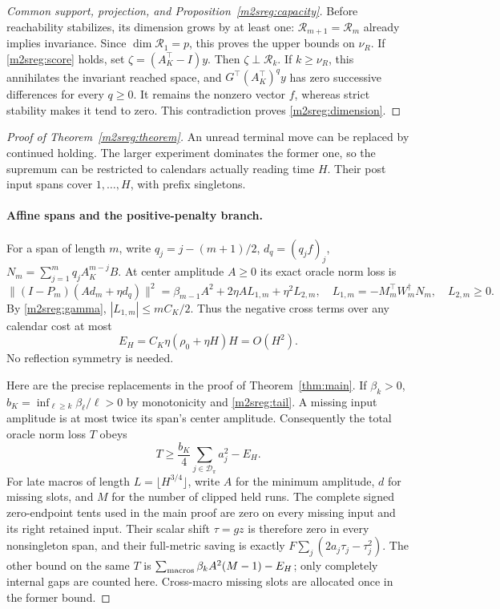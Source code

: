 \documentclass[11pt]{article}
\begin{document}
\begin{proof}[Common support, projection, and Proposition~\ref{m2sreg:capacity}]
Before reachability stabilizes, its dimension grows by at least one:
$\mathcal R_{m+1}=\mathcal R_m$ already implies invariance.
Since $\dim\mathcal R_1=p$, this proves the upper bounds on $\nu_R$.
If \eqref{m2sreg:score} holds, set $\zeta=(A_K^\top-I)y$.
Then $\zeta\perp\mathcal R_k$.
If $k\ge\nu_R$, this annihilates the invariant reached space, and
$G^\top(A_K^\top)^q y$ has zero successive differences for every
$q\ge0$. It remains the nonzero vector $f$, whereas strict stability
makes it tend to zero. This contradiction proves
\eqref{m2sreg:dimension}.
\end{proof}

\begin{proof}[Proof of Theorem~\ref{m2sreg:theorem}]
An unread terminal move can be replaced by continued holding.
The larger experiment dominates the former one, so the supremum can
be restricted to calendars actually reading time $H$.
Their post input spans cover $1,\ldots,H$, with prefix singletons.

\paragraph{Affine spans and the positive-penalty branch.}
For a span of length $m$, write $q_j=j-(m+1)/2$,
$d_q=(q_jf)_j$, $N_m=\sum_{j=1}^m q_jA_K^{m-j}B$.
At center amplitude $A\ge0$ its exact oracle norm loss is
\begin{equation}\label{m2sreg:affine}
\|(I-P_m)(A d_m+\eta d_q)\|^2
=\beta_{m-1}A^2+2\eta A L_{1,m}+\eta^2L_{2,m},
\quad
L_{1,m}=-M_m^\top W_m^\dagger N_m,\quad L_{2,m}\ge0 .
\end{equation}
By \eqref{m2sreg:gamma}, $|L_{1,m}|\le mC_K/2$.
Thus the negative cross terms over any calendar cost at most
\begin{equation}\label{m2sreg:crossbudget}
E_H=C_K\eta(\rho_0+\eta H)H=O(H^2).
\end{equation}
No reflection symmetry is needed.

Here are the precise replacements in the proof of
Theorem~\ref{thm:main}. If $\beta_k>0$,
$b_K=\inf_{\ell\ge k}\beta_\ell/\ell>0$ by monotonicity and
\eqref{m2sreg:tail}. A missing input amplitude is at most twice
its span's center amplitude. Consequently the total oracle norm
loss $T$ obeys
\[
T\ge \frac{b_K}{4}\sum_{j\in\mathcal D_\pi}a_j^2-E_H .
\]
For late macros of length $L=\lfloor H^{3/4}\rfloor$, write
$A$ for the minimum amplitude, $d$ for missing slots, and $M$
for the number of clipped held runs.
The complete signed zero-endpoint tents used in the main proof are
zero on every missing input and its right retained input.
Their scalar shift $\tau=gz$ is therefore zero in every
nonsingleton span, and their full-metric saving is exactly
$F\sum_j(2a_j\tau_j-\tau_j^2)$.
The other bound on the same $T$ is
$\sum_{\rm macros}\beta_kA^2(M-1)-E_H$;
only completely internal gaps are counted here.
Cross-macro missing slots are allocated once in the former bound.


\end{proof}
\end{document}
